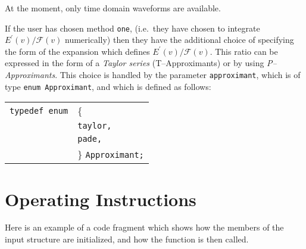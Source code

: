 \documentclass[12pt]{article}
\begin{document}
At the moment, only time domain waveforms are available.

If the user has chosen method \texttt{one}, (i.e.\ they have chosen to integrate $E^{\prime}(v)/\mathcal{F}(v)$ numerically) then they have the additional choice of specifying the form of the expansion which defines $E^{\prime}(v)/\mathcal{F}(v)$. This ratio can be expressed in the form of a \emph{Taylor series} (T--Approximants) or by using \emph{P--Approximants}. This choice is handled by the parameter \texttt{approximant}, which is of type \texttt{enum Approximant}, and which is defined as follows:

\vspace{5mm}

\begin{tabular}{ll}
\texttt{typedef enum} & \{ \\
                      & \texttt{taylor,} \\
                      & \texttt{pade,}  \\
                      & \} \texttt{Approximant;}
\end{tabular}

\vspace{5mm}


\section{Operating Instructions}

Here is an example of a code fragment which shows how the members of the input structure are initialized, and how the function is then called.

\vspace{5mm}
\end{document}
